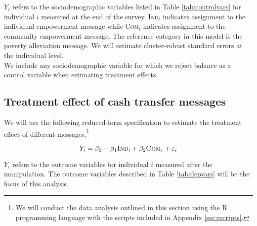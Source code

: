 \documentclass[11pt, a4paper]{article}\usepackage[]{graphicx}\usepackage[]{color}
\begin{document}
        $Y_{i}$ refers to the sociodemographic variables listed in Table \ref{tab:controlvars} for individual $i$ measured at the end of the survey. \textsc{Ind}$_{i}$ indicates assignment to the individual empowerment message while \textsc{Com}$_{i}$ indicates assignment to the community empowerment message. The reference category in this model is the poverty alleviation message. We will estimate cluster-robust standard errors at the individual level. \\

        We include any sociodemographic variable for which we reject balance as a control variable when estimating treatment effects.

    \subsection{Treatment effect of cash transfer messages}

        We will use the following reduced-form specification to estimate the treatment effect of different messages.\footnote{We will conduct the data analysis outlined in this section using the R programming language with the scripts included in Appendix \ref{sec:rscripts}.}

  		\begin{equation} \label{eq:teffect}
            Y_{i} = \beta_{0} + \beta_{1}\text{\textsc{Ind}}_{i} + \beta_{2}\text{\textsc{Com}}_{i} + \varepsilon_{i}
		\end{equation}

        $Y_{i}$ refers to the outcome variables for individual $i$ measured after the manipulation. The outcome variables described in Table \ref{tab:depvars} will be the focus of this analysis.

        \begin{table}[h]
        \centering
        \caption{Primary outcome variables}
        \label{tab:depvars}
        \end{table}
\end{document}
